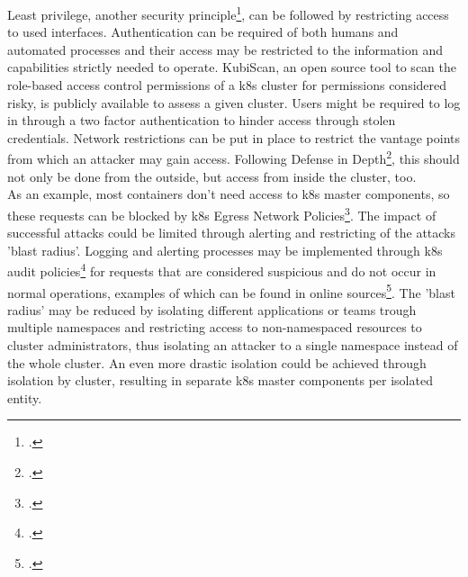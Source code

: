 Least privilege, another security principle\footcite[][, p. 3 to 4]{k8sBook}, can be followed by restricting access to used interfaces. Authentication can be required of both humans and automated processes and their access may be restricted to the information and capabilities strictly needed to operate. KubiScan, an open source tool to scan the role-based access control permissions of a \gls{k8s} cluster for permissions considered risky, is publicly available to assess a given cluster. Users might be required to log in through a two factor authentication to hinder access through stolen credentials. Network restrictions can be put in place to restrict the vantage points from which an attacker may gain access.
Following Defense in Depth\footcite[][, p. 3]{k8sBook}, this should not only be done from the outside, but access from inside the cluster, too. \\
As an example, most containers don't need access to \gls{k8s} master components, so these requests can be blocked by \gls{k8s} Egress Network Policies\footcite[][, section 'The NetworkPolicy Resource']{egressNetPol}. The impact of successful attacks could be limited through alerting and restricting of the attacks 'blast radius'. Logging and alerting processes may be implemented through \gls{k8s} audit policies\footcite[][, section 'Audit Policy']{auditPolicy} for requests that are considered suspicious and do not occur in normal operations, examples of which can be found in online sources\footcite[][, section 'Alerting on the Kubernetes infrastructure']{sysdigMonitoring}. The 'blast radius' may be reduced by isolating different applications or teams trough multiple namespaces and restricting access to non-namespaced resources to cluster administrators, thus isolating an attacker to a single namespace instead of the whole cluster. An even more drastic isolation could be achieved through isolation by cluster, resulting in separate \gls{k8s} master components per isolated entity.

